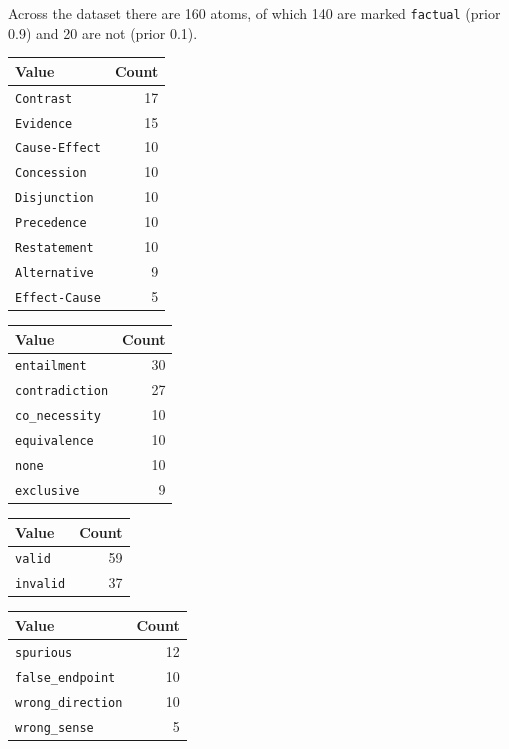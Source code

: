 \documentclass[11pt]{article}
\begin{document}
Across the dataset there are 160 atoms, of which 140 are marked \texttt{factual} (prior 0.9) and 20 are not (prior 0.1).

\begin{minipage}[t]{0.48\linewidth}
\centering
\small
{}
\label{tab:senses}
\begin{tabular}{lr}
\toprule
Value & Count \\
\midrule
\texttt{Contrast} & 17 \\
\texttt{Evidence} & 15 \\
\texttt{Cause-Effect} & 10 \\
\texttt{Concession} & 10 \\
\texttt{Disjunction} & 10 \\
\texttt{Precedence} & 10 \\
\texttt{Restatement} & 10 \\
\texttt{Alternative} & 9 \\
\texttt{Effect-Cause} & 5 \\
\bottomrule
\end{tabular}
\end{minipage}\hfill\begin{minipage}[t]{0.48\linewidth}
\centering
\small
{}
\label{tab:couplings}
\begin{tabular}{lr}
\toprule
Value & Count \\
\midrule
\texttt{entailment} & 30 \\
\texttt{contradiction} & 27 \\
\texttt{co\_necessity} & 10 \\
\texttt{equivalence} & 10 \\
\texttt{none} & 10 \\
\texttt{exclusive} & 9 \\
\bottomrule
\end{tabular}
\end{minipage}

\bigskip
\begin{minipage}[t]{0.48\linewidth}
\centering
\small
{}
\label{tab:validity}
\begin{tabular}{lr}
\toprule
Value & Count \\
\midrule
\texttt{valid} & 59 \\
\texttt{invalid} & 37 \\
\bottomrule
\end{tabular}
\end{minipage}\hfill\begin{minipage}[t]{0.48\linewidth}
\centering
\small
{}
\label{tab:errorkinds}
\begin{tabular}{lr}
\toprule
Value & Count \\
\midrule
\texttt{spurious} & 12 \\
\texttt{false\_endpoint} & 10 \\
\texttt{wrong\_direction} & 10 \\
\texttt{wrong\_sense} & 5 \\
\bottomrule
\end{tabular}
\end{minipage}
\end{document}
